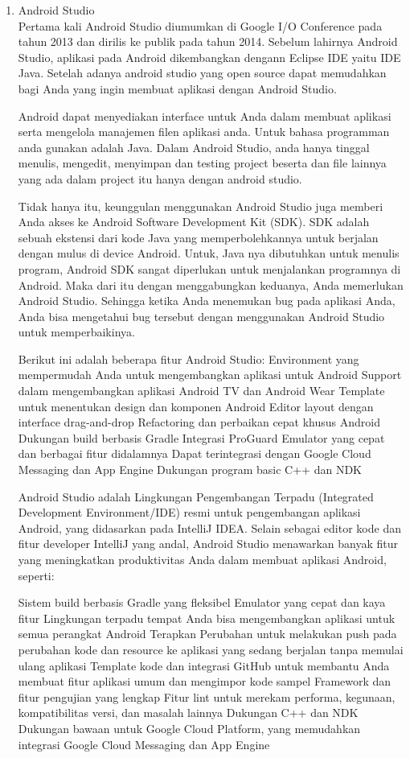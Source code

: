 \begin{enumerate}

\item{Android Studio}\\
Pertama kali Android Studio diumumkan di Google I/O Conference pada tahun 2013 dan dirilis ke publik pada tahun 2014. Sebelum lahirnya Android Studio, aplikasi pada Android dikembangkan dengann Eclipse IDE yaitu IDE Java. Setelah adanya android studio yang open source dapat memudahkan bagi Anda yang ingin membuat aplikasi dengan Android Studio.

Android dapat menyediakan interface untuk Anda dalam membuat aplikasi serta mengelola manajemen filen aplikasi anda.  Untuk bahasa programman anda gunakan adalah Java. Dalam Android Studio, anda hanya tinggal menulis, mengedit, menyimpan  dan testing project beserta dan file lainnya yang ada dalam project itu hanya dengan android studio.

Tidak hanya itu, keunggulan menggunakan Android Studio juga memberi Anda akses ke Android Software Development Kit (SDK). SDK adalah sebuah ekstensi dari kode Java yang memperbolehkannya untuk berjalan dengan mulus di device Android. Untuk, Java nya dibutuhkan untuk menulis program, Android SDK sangat diperlukan untuk menjalankan programnya di Android. Maka dari itu dengan menggabungkan keduanya, Anda memerlukan Android Studio. Sehingga ketika Anda menemukan bug pada aplikasi Anda, Anda bisa mengetahui bug tersebut dengan menggunakan Android Studio untuk memperbaikinya.

Berikut ini adalah beberapa fitur Android Studio:
Environment yang mempermudah Anda untuk mengembangkan aplikasi untuk Android
Support dalam mengembangkan aplikasi Android TV dan Android Wear
Template untuk menentukan design dan komponen Android
Editor layout dengan interface drag-and-drop
Refactoring dan perbaikan cepat khusus Android
Dukungan build berbasis Gradle
Integrasi ProGuard
Emulator yang cepat dan berbagai fitur didalamnya
Dapat terintegrasi dengan Google Cloud Messaging dan App Engine
Dukungan program basic C++ dan NDK

Android Studio adalah Lingkungan Pengembangan Terpadu (Integrated Development Environment/IDE) resmi untuk pengembangan aplikasi Android, yang didasarkan pada IntelliJ IDEA. Selain sebagai editor kode dan fitur developer IntelliJ yang andal, Android Studio menawarkan banyak fitur yang meningkatkan produktivitas Anda dalam membuat aplikasi Android, seperti:

Sistem build berbasis Gradle yang fleksibel
Emulator yang cepat dan kaya fitur
Lingkungan terpadu tempat Anda bisa mengembangkan aplikasi untuk semua perangkat Android
Terapkan Perubahan untuk melakukan push pada perubahan kode dan resource ke aplikasi yang sedang berjalan tanpa memulai ulang aplikasi
Template kode dan integrasi GitHub untuk membantu Anda membuat fitur aplikasi umum dan mengimpor kode sampel
Framework dan fitur pengujian yang lengkap
Fitur lint untuk merekam performa, kegunaan, kompatibilitas versi, dan masalah lainnya
Dukungan C++ dan NDK
Dukungan bawaan untuk Google Cloud Platform, yang memudahkan integrasi Google Cloud Messaging dan App Engine


\end{enumerate}
